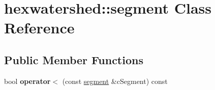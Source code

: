 \hypertarget{classhexwatershed_1_1segment}{\section{hexwatershed\-:\-:segment Class Reference}
\label{classhexwatershed_1_1segment}
}
\subsection*{Public Member Functions}
\begin{DoxyCompactItemize}
\item 
\hypertarget{classhexwatershed_1_1segment_a537893160b9da97cf5d4b256de74ba7b}{bool {\bfseries operator$<$} (const \hyperlink{classhexwatershed_1_1segment}{segment} \&c\-Segment) const }\label{classhexwatershed_1_1segment_a537893160b9da97cf5d4b256de74ba7b}

\end{DoxyCompactItemize}
